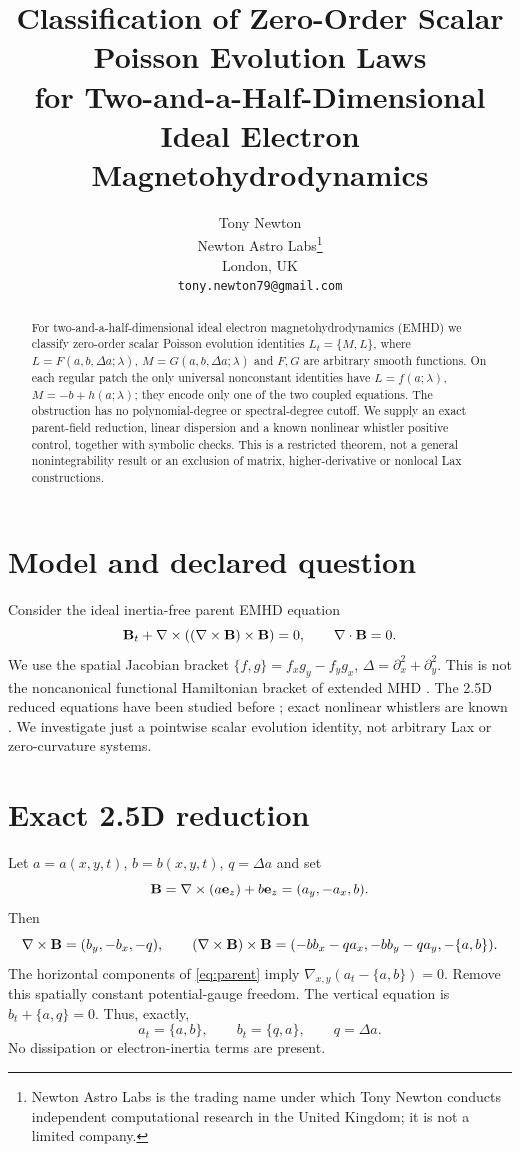 \documentclass[11pt,a4paper]{article}
\title{\textbf{Classification of Zero-Order Scalar Poisson Evolution Laws}\\for Two-and-a-Half-Dimensional Ideal Electron Magnetohydrodynamics}
\author{Tony Newton\\Newton Astro Labs\thanks{Newton Astro Labs is the trading name under which Tony Newton conducts independent computational research in the United Kingdom; it is not a limited company.}\\London, UK\\\texttt{tony.newton79@gmail.com}}
\date{}
\begin{document}
\maketitle
\begin{abstract}
For two-and-a-half-dimensional ideal electron magnetohydrodynamics (EMHD)
we classify zero-order scalar Poisson evolution identities
\(L_t=\{M,L\}\), where \(L=F(a,b,\Delta a;\lambda)\),
\(M=G(a,b,\Delta a;\lambda)\) and \(F,G\) are arbitrary smooth functions.
On each regular patch the only universal nonconstant identities have
\(L=f(a;\lambda)\), \(M=-b+h(a;\lambda)\); they encode only one of the
two coupled equations. The obstruction has no polynomial-degree or
spectral-degree cutoff. We supply an exact parent-field reduction,
linear dispersion and a known nonlinear whistler positive control,
together with symbolic checks. This is a restricted theorem, not a
general nonintegrability result or an exclusion of matrix,
higher-derivative or nonlocal Lax constructions.
\end{abstract}

\section{Model and declared question}
Consider the ideal inertia-free parent EMHD equation
\begin{equation}\label{eq:parent}
 {\bf B}_t+\nabla\times((\nabla\times{\bf B})\times{\bf B})=0,
 \qquad \nabla\cdot{\bf B}=0.
\end{equation}
We use the spatial Jacobian bracket
\(\{f,g\}=f_xg_y-f_yg_x\), \(\Delta=\partial_x^2+\partial_y^2\).
This is not the noncanonical functional Hamiltonian bracket of
extended MHD \cite{abdelhamid2015}. The 2.5D reduced equations have
been studied before \cite{peng2026}; exact nonlinear whistlers are
known \cite{lyutikov2013}. We investigate just a pointwise scalar
evolution identity, not arbitrary Lax or zero-curvature systems.

\section{Exact 2.5D reduction}
Let \(a=a(x,y,t)\), \(b=b(x,y,t)\), \(q=\Delta a\) and set
\[
 {\bf B}=\nabla\times(a{\bf e}_z)+b{\bf e}_z=(a_y,-a_x,b).
\]
Then
\[
 \nabla\times{\bf B}=(b_y,-b_x,-q),\qquad
 (\nabla\times{\bf B})\times{\bf B}
 =(-bb_x-qa_x,-bb_y-qa_y,-\{a,b\}).
\]
The horizontal components of \eqref{eq:parent} imply
\(\nabla_{x,y}(a_t-\{a,b\})=0\). Remove this spatially constant
potential-gauge freedom. The vertical equation is
\(b_t+\{a,q\}=0\). Thus, exactly,
\begin{equation}\label{eq:reduced}
 a_t=\{a,b\},\qquad b_t=\{q,a\},\qquad q=\Delta a.
\end{equation}
No dissipation or electron-inertia terms are present.
\end{document}
